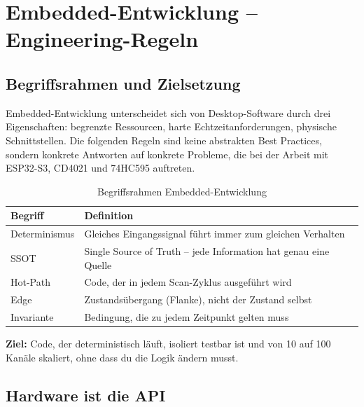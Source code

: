 
\section{Embedded-Entwicklung – Engineering-Regeln}

\subsection{Begriffsrahmen und Zielsetzung}

Embedded-Entwicklung unterscheidet sich von Desktop-Software durch drei Eigenschaften: begrenzte Ressourcen, harte Echtzeitanforderungen, physische Schnittstellen. Die folgenden Regeln sind keine abstrakten Best Practices, sondern konkrete Antworten auf konkrete Probleme, die bei der Arbeit mit ESP32-S3, CD4021 und 74HC595 auftreten.

\begin{table}[htbp]
\centering
\begin{tabular}{@{}ll@{}}
\toprule
\textbf{Begriff} & \textbf{Definition} \\
\midrule
Determinismus & Gleiches Eingangssignal führt immer zum gleichen Verhalten \\
SSOT          & Single Source of Truth – jede Information hat genau eine Quelle \\
Hot-Path      & Code, der in jedem Scan-Zyklus ausgeführt wird \\
Edge          & Zustandsübergang (Flanke), nicht der Zustand selbst \\
Invariante    & Bedingung, die zu jedem Zeitpunkt gelten muss \\
\bottomrule
\end{tabular}
\caption{Begriffsrahmen Embedded-Entwicklung}
\label{tab:embedded-begriffe}
\end{table}

\textbf{Ziel:} Code, der deterministisch läuft, isoliert testbar ist und von 10 auf 100 Kanäle skaliert, ohne dass du die Logik ändern musst.

\subsection{Hardware ist die API}

